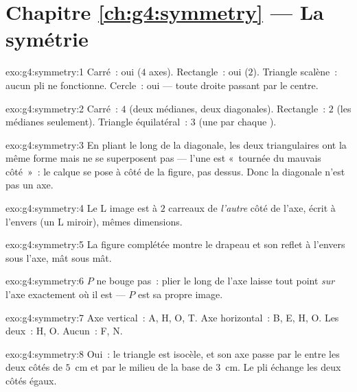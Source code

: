 \section*{Chapitre \ref{ch:g4:symmetry} --- La symétrie}

\begin{solution}{exo:g4:symmetry:1}
Carré~: oui ($4$ axes). Rectangle~: oui ($2$). Triangle scalène~:
aucun pli ne fonctionne. Cercle~: oui --- toute droite passant par
le centre.
\end{solution}

\begin{solution}{exo:g4:symmetry:2}
Carré~: $4$ (deux médianes, deux diagonales). Rectangle~: $2$ (les
médianes seulement). Triangle équilatéral~: $3$ (une par chaque
).
\end{solution}

\begin{solution}{exo:g4:symmetry:3}
En pliant le long de la diagonale, les deux  triangulaires
ont la même forme mais ne se superposent pas --- l'une est
«~tournée du mauvais côté~»~: le calque se pose à côté de la
figure, pas dessus. Donc la diagonale n'est pas un axe.
\end{solution}

\begin{solution}{exo:g4:symmetry:4}
Le L image est à $2$ carreaux de \emph{l'autre} côté de l'axe,
écrit à l'envers (un L miroir), mêmes dimensions.
\end{solution}

\begin{solution}{exo:g4:symmetry:5}
La figure complétée montre le drapeau et son reflet à l'envers sous
l'axe, mât sous mât.
\end{solution}

\begin{solution}{exo:g4:symmetry:6}
$P$ ne bouge pas~: plier le long de l'axe laisse tout point
\emph{sur} l'axe exactement où il est --- $P$ est sa propre image.
\end{solution}

\begin{solution}{exo:g4:symmetry:7}
Axe vertical~: A, H, O, T. Axe horizontal~: B, E, H, O. Les deux~:
H, O. Aucun~: F, N.
\end{solution}

\begin{solution}{exo:g4:symmetry:8}
Oui~: le triangle est isocèle, et son axe passe par le  entre
les deux côtés de $5$~cm et par le milieu de la base de $3$~cm. Le
pli échange les deux côtés égaux.
\end{solution}

